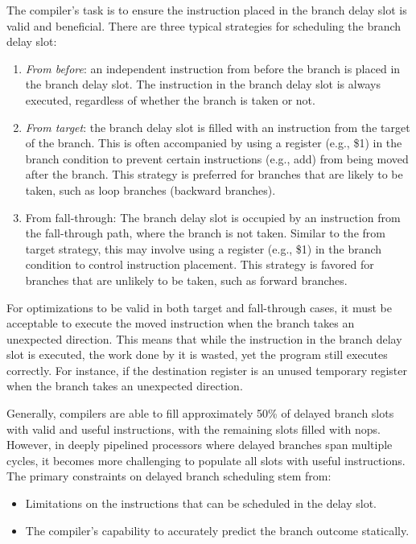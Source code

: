 The compiler's task is to ensure the instruction placed in the branch delay slot is valid and beneficial. 
There are three typical strategies for scheduling the branch delay slot:
\begin{enumerate}
    \item \textit{From before}: an independent instruction from before the branch is placed in the branch delay slot.
        The instruction in the branch delay slot is always executed, regardless of whether the branch is taken or not.
    \item \textit{From target}: the branch delay slot is filled with an instruction from the target of the branch. 
        This is often accompanied by using a register (e.g., \$1) in the branch condition to prevent certain instructions (e.g., add) from being moved after the branch.
        This strategy is preferred for branches that are likely to be taken, such as loop branches (backward branches).
    \item From fall-through: The branch delay slot is occupied by an instruction from the fall-through path, where the branch is not taken. 
        Similar to the from target strategy, this may involve using a register (e.g., \$1) in the branch condition to control instruction placement.
        This strategy is favored for branches that are unlikely to be taken, such as forward branches.
\end{enumerate}

For optimizations to be valid in both target and fall-through cases, it must be acceptable to execute the moved instruction when the branch takes an unexpected direction. 
This means that while the instruction in the branch delay slot is executed, the work done by it is wasted, yet the program still executes correctly. 
For instance, if the destination register is an unused temporary register when the branch takes an unexpected direction.

Generally, compilers are able to fill approximately 50\% of delayed branch slots with valid and useful instructions, with the remaining slots filled with nops. 
However, in deeply pipelined processors where delayed branches span multiple cycles, it becomes more challenging to populate all slots with useful instructions.
The primary constraints on delayed branch scheduling stem from:
\begin{itemize}
    \item Limitations on the instructions that can be scheduled in the delay slot.
    \item The compiler's capability to accurately predict the branch outcome statically.
\end{itemize}


